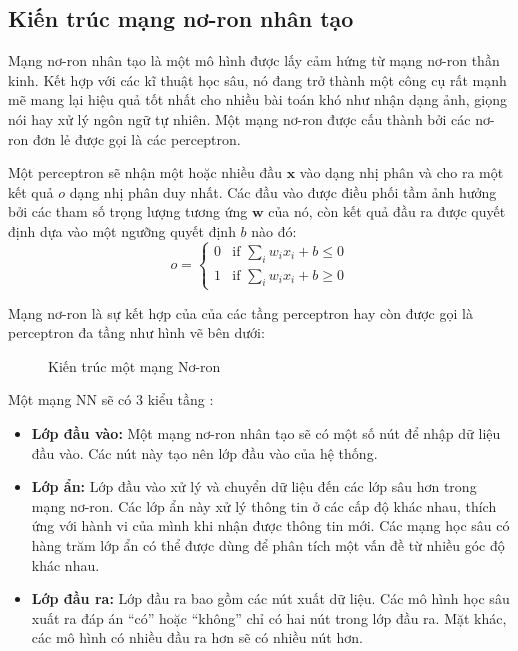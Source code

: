 \subsection{Kiến trúc mạng nơ-ron nhân tạo}
Mạng nơ-ron nhân tạo là một mô hình được lấy cảm hứng từ mạng nơ-ron thần kinh. Kết hợp với các kĩ thuật học sâu, nó đang trở thành một công cụ rất mạnh mẽ mang lại hiệu quả tốt nhất cho nhiều bài toán khó như nhận dạng ảnh, giọng nói hay xử lý ngôn ngữ tự nhiên. Một mạng nơ-ron được cấu thành bởi các nơ-ron đơn lẻ được gọi là các perceptron.

Một perceptron sẽ nhận một hoặc nhiều đầu $\mathbf{x}$ vào dạng nhị phân và cho ra một kết quả $o$ dạng nhị phân duy nhất. Các đầu vào được điều phối tầm ảnh hưởng bởi các tham số trọng lượng tương ứng $\mathbf{w}$ của nó, còn kết quả đầu ra được quyết định dựa vào một ngưỡng quyết định $b$ nào đó:
$$o = \begin{cases}
        0 & \text{if } \sum_i w_i x_i +b \leq 0 \\
        1 & \text{if } \sum_i w_i x_i +b \ge 0
    \end{cases}$$

Mạng nơ-ron là sự kết hợp của của các tầng perceptron hay còn được gọi là perceptron đa tầng như hình vẽ bên dưới:
\begin{figure}[h]
    
    \centering
    \caption{Kiến trúc một mạng Nơ-ron}

\end{figure}

Một mạng NN sẽ có 3 kiểu tầng \cite{aws-deep-learning}:
\begin{itemize}
    \item \textbf{Lớp đầu vào:} Một mạng nơ-ron nhân tạo sẽ có một số nút để nhập dữ liệu đầu vào. Các nút này tạo nên lớp đầu vào của hệ thống.
    \item \textbf{Lớp ẩn:} Lớp đầu vào xử lý và chuyển dữ liệu đến các lớp sâu hơn trong mạng nơ-ron. Các lớp ẩn này xử lý thông tin ở các cấp độ khác nhau, thích ứng với hành vi của mình khi nhận được thông tin mới. Các mạng học sâu có hàng trăm lớp ẩn có thể được dùng để phân tích một vấn đề từ nhiều góc độ khác nhau.
    \item \textbf{Lớp đầu ra:} Lớp đầu ra bao gồm các nút xuất dữ liệu. Các mô hình học sâu xuất ra đáp án ``có'' hoặc ``không'' chỉ có hai nút trong lớp đầu ra. Mặt khác, các mô hình có nhiều đầu ra hơn sẽ có nhiều nút hơn.
\end{itemize}

